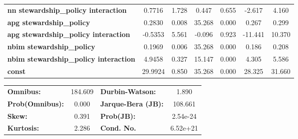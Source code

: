 \documentclass[a4paper]{article}
\begin{document}
\begin{center}
\begin{tabular}{lcccccc}
  \textbf{nn stewardship\_policy interaction}        &       0.7716  &        1.728     &     0.447  &         0.655        &       -2.617    &        4.160     \\
  \textbf{apg stewardship\_policy}                   &       0.2830  &        0.008     &    35.268  &         0.000        &        0.267    &        0.299     \\
  \textbf{apg stewardship\_policy interaction}       &      -0.5353  &        5.561     &    -0.096  &         0.923        &      -11.441    &       10.370     \\
  \textbf{nbim stewardship\_policy}                  &       0.1969  &        0.006     &    35.268  &         0.000        &        0.186    &        0.208     \\
  \textbf{nbim stewardship\_policy interaction}      &       4.9458  &        0.327     &    15.147  &         0.000        &        4.305    &        5.586     \\
  \textbf{const}                                     &      29.9924  &        0.850     &    35.268  &         0.000        &       28.325    &       31.660     \\
  \bottomrule
  \end{tabular}
  \begin{tabular}{lclc}
  \textbf{Omnibus:}       & 184.609 & \textbf{  Durbin-Watson:     } &    1.890  \\
  \textbf{Prob(Omnibus):} &   0.000 & \textbf{  Jarque-Bera (JB):  } &  108.661  \\
  \textbf{Skew:}          &   0.391 & \textbf{  Prob(JB):          } & 2.54e-24  \\
  \textbf{Kurtosis:}      &   2.286 & \textbf{  Cond. No.          } & 6.52e+21  \\
  \bottomrule
  \end{tabular}
  \end{center}
\end{document}
